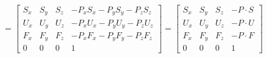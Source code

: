 \documentclass[preview]{standalone}
\begin{document}
\[
  = \begin{bmatrix}
    S_x & S_y & S_z & -P_xS_x - P_yS_y -P_zS_z \\
    U_x & U_y & U_z & -P_xU_x - P_yU_y -P_zU_z \\
    F_x & F_y & F_z & -P_xF_x - P_yF_y -P_zF_z \\
    0 & 0 & 0 & 1 
  \end{bmatrix} =
  \begin{bmatrix}
    S_x & S_y & S_z & -P \cdot S \\
    U_x & U_y & U_z & -P \cdot U\\
    F_x & F_y & F_z & -P \cdot F\\
    0 & 0 & 0 & 1 
  \end{bmatrix}
\]
\end{document}

